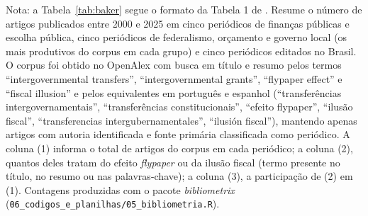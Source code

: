 \begin{table}[htbp]
\par\smallskip
\begin{minipage}{0.97\textwidth}\scriptsize
Nota: a Tabela~\ref{tab:baker} segue o formato da Tabela 1 de . Resume o número de artigos publicados entre 2000 e 2025 em cinco periódicos de finanças públicas e escolha pública, cinco periódicos de federalismo, orçamento e governo local (os mais produtivos do corpus em cada grupo) e cinco periódicos editados no Brasil. O corpus foi obtido no OpenAlex com busca em título e resumo pelos termos ``intergovernmental transfers'', ``intergovernmental grants'', ``flypaper effect'' e ``fiscal illusion'' e pelos equivalentes em português e espanhol (``transferências intergovernamentais'', ``transferências constitucionais'', ``efeito flypaper'', ``ilusão fiscal'', ``transferencias intergubernamentales'', ``ilusión fiscal''), mantendo apenas artigos com autoria identificada e fonte primária classificada como periódico. A coluna (1) informa o total de artigos do corpus em cada periódico; a coluna (2), quantos deles tratam do efeito \textit{flypaper} ou da ilusão fiscal (termo presente no título, no resumo ou nas palavras-chave); a coluna (3), a participação de (2) em (1). Contagens produzidas com o pacote \textit{bibliometrix} \cite{aria2017} (\texttt{06\_codigos\_e\_planilhas/05\_bibliometria.R}).
\end{minipage}
\end{table}
